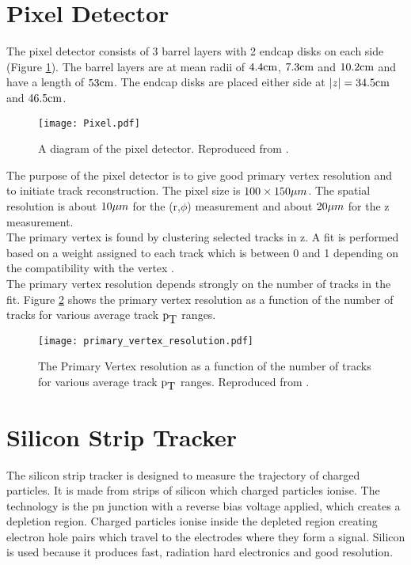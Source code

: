 \section{Pixel Detector}

The pixel detector consists of 3 barrel layers with 2 endcap disks on each side
(Figure \ref{fig:Pixel}). The barrel layers are at mean radii of $4.4\mbox{cm}$,
$7.3\mbox{cm}$ and $10.2\mbox{cm}$ and have a length of $53\mbox{cm}$. The endcap disks are placed 
either side at $|z| = 34.5\mbox{cm}$ and $46.5\mbox{cm}$. \\

\begin{figure}
\texttt{[image: Pixel.pdf]}
\caption{A diagram of the pixel detector. Reproduced from \cite{physics_tdr_1}.}
\label{fig:Pixel}
\end{figure}

The purpose of the pixel detector is to give good primary vertex resolution and
to initiate track reconstruction. The pixel size is $100\times150\mu m$. The 
spatial resolution is about $10\mu m$ for the (r,$\phi$) measurement and about 
$20\mu m$ for the z measurement. \\

The primary vertex is found by clustering selected tracks in z. A fit is
performed based on a weight assigned to each track which is between 0 and 1
depending on the compatibility with the vertex \cite{primary_vertex}. \\

The primary vertex resolution depends strongly on the number of tracks in the
fit. Figure \ref{fig:primary_vertex} shows the primary vertex resolution as a
function of the number of tracks for various average track $\mbox{p}_{\mbox{T}}$ ranges.

\begin{figure}
\begin{center}
\texttt{[image: primary\_vertex\_resolution.pdf]}
\end{center}
\caption{The Primary Vertex resolution as a function of the number of tracks for
various average track $\mbox{p}_{\mbox{T}}$ ranges. Reproduced from \cite{primary_vertex}.}
\label{fig:primary_vertex}
\end{figure}

\section{Silicon Strip Tracker}

The silicon strip tracker is designed to measure the trajectory of charged 
particles. It is made from strips of silicon which charged particles ionise. The
technology is the pn junction with a reverse bias voltage applied, which creates
a depletion region. Charged particles ionise inside the depleted region creating
electron hole pairs which travel to the electrodes where they form a signal. 
Silicon is used because it produces fast, radiation hard electronics and good
resolution. \\
  
